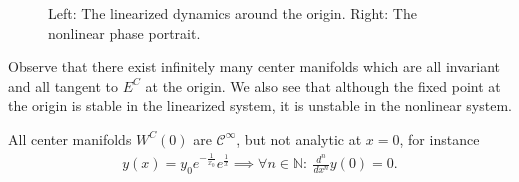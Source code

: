 \begin{ex}
\begin{figure}[h!]
		\caption{Left: The linearized dynamics around the origin. Right: The nonlinear phase portrait. }
		\label{fig:cmfd_lin_ex}
	\end{figure}
	Observe that there exist infinitely many center manifolds which are all invariant and all tangent to $E^{C}$ at the origin. We also see that although the fixed point at the origin is stable in the linearized system, it is unstable in the nonlinear system.

	\begin{remark}[]
		All center manifolds $W^{C}(0)$ are $\mathcal{C}^{\infty }$, but not analytic at $x=0$, for instance
		\begin{align}
			y(x) = y_0 e^{-\frac{1}{x_0}}e^{\frac{1}{x}} \implies \forall n \in \mathbb{N}:\ \frac{d^{n}}{dx^{n}}y(0) = 0.
		\end{align}
		
	\end{remark}
	
\end{ex}

